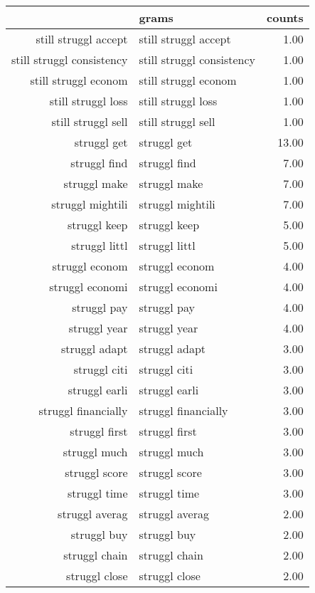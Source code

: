 \begin{table}[ht]
\centering
\begin{tabular}{rlr}
  \hline
 & grams & counts \\ 
  \hline
still struggl accept & still struggl accept & 1.00 \\ 
  still struggl consistency & still struggl consistency & 1.00 \\ 
  still struggl econom & still struggl econom & 1.00 \\ 
  still struggl loss & still struggl loss & 1.00 \\ 
  still struggl sell & still struggl sell & 1.00 \\ 
  struggl get & struggl get & 13.00 \\ 
  struggl find & struggl find & 7.00 \\ 
  struggl make & struggl make & 7.00 \\ 
  struggl mightili & struggl mightili & 7.00 \\ 
  struggl keep & struggl keep & 5.00 \\ 
  struggl littl & struggl littl & 5.00 \\ 
  struggl econom & struggl econom & 4.00 \\ 
  struggl economi & struggl economi & 4.00 \\ 
  struggl pay & struggl pay & 4.00 \\ 
  struggl year & struggl year & 4.00 \\ 
  struggl adapt & struggl adapt & 3.00 \\ 
  struggl citi & struggl citi & 3.00 \\ 
  struggl earli & struggl earli & 3.00 \\ 
  struggl financially & struggl financially & 3.00 \\ 
  struggl first & struggl first & 3.00 \\ 
  struggl much & struggl much & 3.00 \\ 
  struggl score & struggl score & 3.00 \\ 
  struggl time & struggl time & 3.00 \\ 
  struggl averag & struggl averag & 2.00 \\ 
  struggl buy & struggl buy & 2.00 \\ 
  struggl chain & struggl chain & 2.00 \\ 
  struggl close & struggl close & 2.00 \\ 

\end{tabular}
\end{table}
